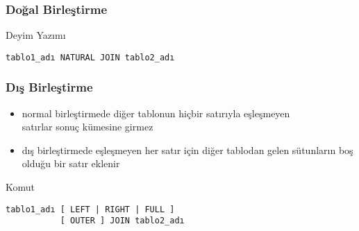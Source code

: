 \documentclass[dvipsnames]{beamer}
\theoremstyle{definition}
\theoremstyle{example}
\theoremstyle{plain}
\begin{document}
\begin{frame}[fragile]
  \frametitle{Doğal Birleştirme}

  \begin{block}{Deyim Yazımı}
    \begin{lstlisting}
tablo1_adı NATURAL JOIN tablo2_adı
    \end{lstlisting}
  \end{block}
\end{frame}

\begin{frame}[fragile]
  \frametitle{Dış Birleştirme}

  \begin{itemize}
    \item normal birleştirmede diğer tablonun hiçbir satırıyla eşleşmeyen\\
      satırlar sonuç kümesine girmez

    \item dış birleştirmede eşleşmeyen her satır için diğer tablodan gelen
      sütunların boş olduğu bir satır eklenir
  \end{itemize}

  \pause
  \begin{block}{Komut}
    \begin{lstlisting}
tablo1_adı [ LEFT | RIGHT | FULL ]
           [ OUTER ] JOIN tablo2_adı
    \end{lstlisting}
  \end{block}
\end{frame}
\end{document}
